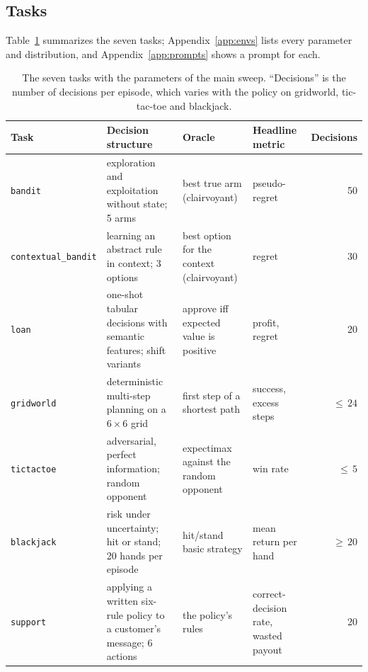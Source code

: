 \subsection{Tasks}
\label{sec:bench:tasks}

Table~\ref{tab:tasks} summarizes the seven tasks; Appendix~\ref{app:envs} lists every parameter and distribution, and Appendix~\ref{app:prompts} shows a prompt for each.

\begin{table}[t]
\centering\small
\caption{The seven tasks with the parameters of the main sweep. ``Decisions'' is the number of decisions per episode, which varies with the policy on gridworld, tic-tac-toe and blackjack.}
\label{tab:tasks}
\begin{tabularx}{\linewidth}{@{}l X X X r@{}}
\toprule
Task & Decision structure & Oracle & Headline metric & Decisions\\
\midrule
\texttt{bandit} & exploration and exploitation without state; 5 arms & best true arm (clairvoyant) & pseudo-regret & 50\\
\texttt{contextual\_bandit} & learning an abstract rule in context; 3 options & best option for the context (clairvoyant) & regret & 30\\
\texttt{loan} & one-shot tabular decisions with semantic features; shift variants & approve iff expected value is positive & profit, regret & 20\\
\texttt{gridworld} & deterministic multi-step planning on a $6\times 6$ grid & first step of a shortest path & success, excess steps & ${\le}\,24$\\
\texttt{tictactoe} & adversarial, perfect information; random opponent & expectimax against the random opponent & win rate & ${\le}\,5$\\
\texttt{blackjack} & risk under uncertainty; hit or stand; 20 hands per episode & hit/stand basic strategy & mean return per hand & ${\ge}\,20$\\
\texttt{support} & applying a written six-rule policy to a customer's message; 6 actions & the policy's rules & correct-decision rate, wasted payout & 20\\
\bottomrule
\end{tabularx}
\end{table}

